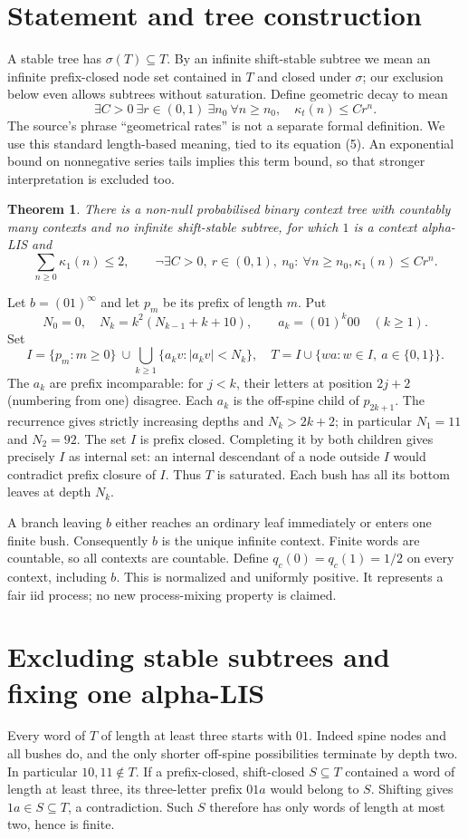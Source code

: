 \documentclass[11pt]{article}
\newtheorem{theorem}{Theorem}
\newcommand{\kap}{\kappa}
\begin{document}
\section{Statement and tree construction}
A stable tree has $\sigma(T)\subseteq T$. By an infinite shift-stable subtree
we mean an infinite prefix-closed node set contained in $T$ and closed under
$\sigma$; our exclusion below even allows subtrees without saturation.
Define geometric decay to mean
\[
 \exists C>0\ \exists r\in(0,1)\ \exists n_0\ \forall n\geq n_0,
 \quad \kap_t(n)\leq Cr^n.
\]
The source's phrase ``geometrical rates'' is not a separate formal definition.
We use this standard length-based meaning, tied to its equation (5).
An exponential bound on nonnegative series tails implies this term bound,
so that stronger interpretation is excluded too.

\begin{theorem}
There is a non-null probabilised binary context tree with countably many
contexts and no infinite shift-stable subtree, for which $1$ is a context
alpha-LIS and
\[
 \sum_{n\geq0}\kap_1(n)\leq2,\qquad
 \neg\exists C>0,\ r\in(0,1),\ n_0:\ \forall n\geq n_0,
 \kap_1(n)\leq Cr^n.
\]
\end{theorem}
Let $b=(01)^\infty$ and let $p_m$ be its prefix of length $m$. Put
\[
 N_0=0,\quad N_k=k^2(N_{k-1}+k+10),\qquad a_k=(01)^k00\quad(k\geq1).
\]
Set
\[
 I=\{p_m:m\geq0\}\ \cup\!
 \bigcup_{k\geq1}\{a_kv:|a_kv|<N_k\},\quad
 T=I\cup\{wa:w\in I,\ a\in\{0,1\}\}.
\]
The $a_k$ are prefix incomparable: for $j<k$, their letters at position
$2j+2$ (numbering from one) disagree. Each $a_k$ is the off-spine child
of $p_{2k+1}$. The recurrence gives strictly increasing depths and
$N_k>2k+2$; in particular $N_1=11$ and $N_2=92$.
The set $I$ is prefix closed. Completing it by both children gives precisely
$I$ as internal set: an internal descendant of a node outside $I$ would
contradict prefix closure of $I$. Thus $T$ is saturated. Each bush has all
its bottom leaves at depth $N_k$.

A branch leaving $b$ either reaches an ordinary leaf immediately or enters
one finite bush. Consequently $b$ is the unique infinite context. Finite
words are countable, so all contexts are countable. Define
$q_c(0)=q_c(1)=1/2$ on every context, including $b$. This is normalized and
uniformly positive. It represents a fair iid process; no new process-mixing
property is claimed.
\newpage
\section{Excluding stable subtrees and fixing one alpha-LIS}
Every word of $T$ of length at least three starts with $01$.
Indeed spine nodes and all bushes do, and the only shorter off-spine
possibilities terminate by depth two. In particular $10,11\notin T$.
If a prefix-closed, shift-closed $S\subseteq T$ contained a word of length
at least three, its three-letter prefix $01a$ would belong to $S$.
Shifting gives $1a\in S\subseteq T$, a contradiction. Such $S$ therefore
has only words of length at most two, hence is finite.
\end{document}
